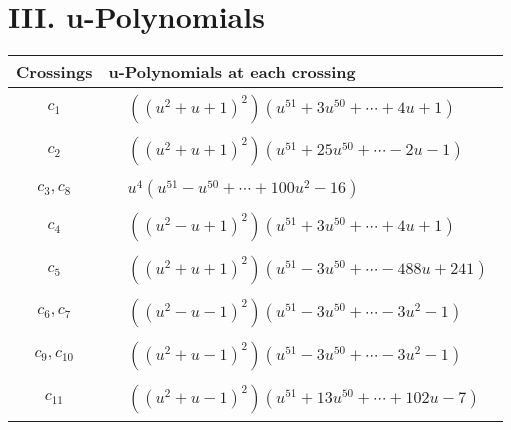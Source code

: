 \documentclass[1p]{elsarticle_modified}
\theoremstyle{definition}
\begin{document}
\newpage\renewcommand{\arraystretch}{1}
\centering \section*{ III. u-Polynomials}
\begin{tabular}{m{50pt}|m{274pt}}
Crossings & \hspace{64pt}u-Polynomials at each crossing \\
\hline $$\begin{aligned}c_{1}\end{aligned}$$&$\begin{aligned}
&((u^2+u+1)^2)(u^{51}+3 u^{50}+\cdots+4 u+1)
\end{aligned}$\\
\hline $$\begin{aligned}c_{2}\end{aligned}$$&$\begin{aligned}
&((u^2+u+1)^2)(u^{51}+25 u^{50}+\cdots-2 u-1)
\end{aligned}$\\
\hline $$\begin{aligned}c_{3},c_{8}\end{aligned}$$&$\begin{aligned}
&u^4(u^{51}- u^{50}+\cdots+100 u^2-16)
\end{aligned}$\\
\hline $$\begin{aligned}c_{4}\end{aligned}$$&$\begin{aligned}
&((u^2- u+1)^2)(u^{51}+3 u^{50}+\cdots+4 u+1)
\end{aligned}$\\
\hline $$\begin{aligned}c_{5}\end{aligned}$$&$\begin{aligned}
&((u^2+u+1)^2)(u^{51}-3 u^{50}+\cdots-488 u+241)
\end{aligned}$\\
\hline $$\begin{aligned}c_{6},c_{7}\end{aligned}$$&$\begin{aligned}
&((u^2- u-1)^2)(u^{51}-3 u^{50}+\cdots-3 u^2-1)
\end{aligned}$\\
\hline $$\begin{aligned}c_{9},c_{10}\end{aligned}$$&$\begin{aligned}
&((u^2+u-1)^2)(u^{51}-3 u^{50}+\cdots-3 u^2-1)
\end{aligned}$\\
\hline $$\begin{aligned}c_{11}\end{aligned}$$&$\begin{aligned}
&((u^2+u-1)^2)(u^{51}+13 u^{50}+\cdots+102 u-7)
\end{aligned}$\\
\hline
\end{tabular}\newpage\renewcommand{\arraystretch}{1}
\end{document}
